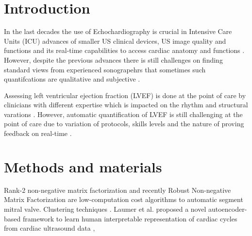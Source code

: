 \section{Introduction}
\label{sec:intro}
In the last decades the use of Echochardiography is crucial in Intensive Care Units (ICU) advances of smaller US clinical devices, US image quality and functions and its real-time  capabilities to access cardiac anatomy and functions \cite{Feigenbaum1996, Vieillard-Baron2008, singh2007, cambell2018}.
However, despite the previous advances there is still challenges on finding standard views from experienced sonograpehrs that sometimes  such quantifcations are qualitative and subjective \cite{Feigenbaum1996}.

Assessing left ventricular ejection fraction (LVEF) is done at the point of care by clinicians with different expertise which is impacted on the rhythm and structural varations \cite{liu2021}.
However, automatic quantification of LVEF is still challenging at the point of care due to variation of protocols, skills levels \cite{field2011} and the nature of proving feedback on real-time \cite{liu2021}.

\section{Methods and materials}
Rank-2 non-negative matrix factorization \cite{yuan2017} and recently Robust Non-negative Matrix Factorization
\cite{dukler2018} are low-computation cost algorithms to automatic segment mitral valve.
Clustering techniques \cite{zhang2018} \cite{kusunose2021}.
Laumer et al. proposed a novel autoencoder-based framework to learn human interpretable representation of cardiac cycles from cardiac ultrasound data \cite{laumer2020},
